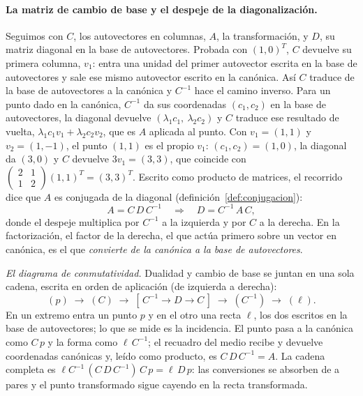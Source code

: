 \paragraph{La matriz de cambio de base y el despeje de la diagonalización.} Seguimos con
\(C\), los autovectores en columnas, \(A\), la transformación, y \(D\), su matriz diagonal en
la base de autovectores. Probada con \((1,0)^T\), \(C\) devuelve su primera columna, \(v_1\):
entra una unidad del primer autovector escrita en la base de autovectores y sale ese mismo
autovector escrito en la canónica. Así \(C\) traduce de la base de autovectores a la canónica
y \(C^{-1}\) hace el camino inverso. Para un punto dado en la canónica, \(C^{-1}\) da sus
coordenadas \((c_1,c_2)\) en la base de autovectores, la diagonal devuelve
\((\lambda_1c_1,\ \lambda_2c_2)\) y \(C\) traduce ese resultado de vuelta,
\(\lambda_1c_1v_1+\lambda_2c_2v_2\), que es \(A\) aplicada al punto. Con \(v_1=(1,1)\) y
\(v_2=(1,-1)\), el punto \((1,1)\) es el propio \(v_1\): \((c_1,c_2)=(1,0)\), la diagonal da
\((3,0)\) y \(C\) devuelve \(3v_1=(3,3)\), que coincide con
\(\begin{pmatrix}2&1\\1&2\end{pmatrix}(1,1)^T=(3,3)^T\). Escrito como producto de matrices, el
recorrido dice que \(A\) es conjugada de la diagonal (definición~\ref{def:conjugacion}):
\[
  A=C\,D\,C^{-1}
  \quad\Longrightarrow\quad
  D=C^{-1}\,A\,C ,
\]
donde el despeje multiplica por \(C^{-1}\) a la izquierda y por \(C\) a la derecha. En la
factorización, el factor de la derecha, el que actúa primero sobre un vector en canónica, es
el que \emph{convierte de la canónica a la base de autovectores}.

\emph{El diagrama de conmutatividad.} Dualidad y cambio de base se juntan en una sola cadena,
escrita en orden de aplicación (de izquierda a derecha):
\[
  (p)\;\to\;(C)\;\to\;[\,C^{-1}\to D\to C\,]\;\to\;(C^{-1})\;\to\;(\ell) .
\]
En un extremo entra un punto \(p\) y en el otro una recta \(\ell\), los dos escritos en la
base de autovectores; lo que se mide es la incidencia. El punto pasa a la canónica como
\(C\,p\) y la forma como \(\ell\,C^{-1}\); el recuadro del medio recibe y devuelve
coordenadas canónicas y, leído como producto, es \(C\,D\,C^{-1}=A\). La cadena completa es
\(\ell C^{-1}\,(C\,D\,C^{-1})\,C\,p=\ell\,D\,p\): las conversiones se absorben de a pares y
el punto transformado sigue cayendo en la recta transformada.

